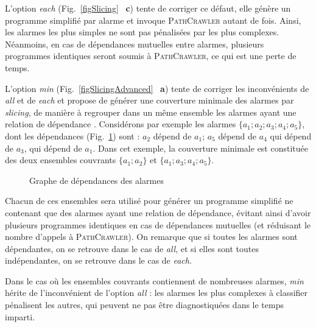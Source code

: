 \documentclass[french]{spimufcphdthesis}
\begin{document}
L'option {\em each} (Fig.~\ref{figSlicing} ~\textbf{c}) tente de corriger ce
défaut, elle génère un programme simplifié par alarme et invoque
\textsc{PathCrawler} autant de fois. Ainsi, les alarmes les plus simples ne sont
pas pénalisées par les plus complexes. Néanmoins, en cas de dépendances
mutuelles entre alarmes, plusieurs programmes identiques seront soumis à
\textsc{PathCrawler}, ce qui est une perte de temps.




L'option {\em min} (Fig.~\ref{figSlicingAdvanced} ~\textbf{a}) tente de corriger
les inconvénients de {\em all} et de {\em each} et propose de générer une
couverture minimale des alarmes par {\em slicing}, de manière à regrouper dans
un même ensemble les alarmes ayant une relation de dépendance \cite{SANTE}.
Considérons par exemple les alarmes $\{a_1; a_2; a_3; a_4; a_5\}$, dont les
dépendances (Fig.~\ref{fig:deps}) sont : $a_2$ dépend de $a_1$; $a_5$ dépend de
$a_4$ qui dépend de $a_3$, qui dépend de $a_1$.
Dans cet exemple, la couverture minimale est constituée des deux ensembles
couvrants $\{a_1; a_2\}$ et $\{a_1; a_3; a_4; a_5\}$.


\begin{figure}
  \centering
  \caption{Graphe de dépendances des alarmes}
  \label{fig:deps}
\end{figure}


Chacun de ces ensembles sera utilisé pour générer un programme simplifié ne
contenant que des alarmes ayant une relation de dépendance, évitant ainsi
d'avoir plusieurs programmes identiques en cas de dépendances mutuelles (et
réduisant le nombre d'appels à \textsc{PathCrawler}).
On remarque que si toutes les alarmes sont dépendantes, on se retrouve dans le
cas de {\em all}, et si elles sont toutes indépendantes, on se retrouve dans le
cas de {\em each}.

Dans le cas où les ensembles couvrants contiennent de nombreuses alarmes,
{\em min} hérite de l'inconvénient de l'option {\em all} : les alarmes les plus
complexes à classifier pénalisent les autres, qui peuvent ne pas être
diagnostiquées dans le temps imparti.
\end{document}
